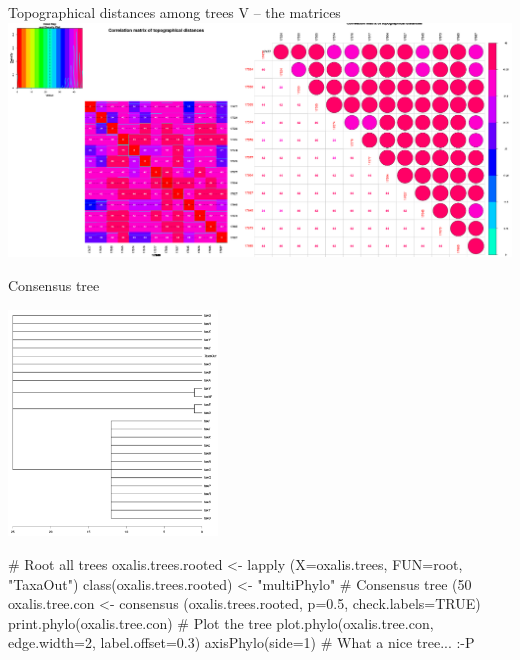 \documentclass[compress, ucs, xelatex, 11pt, xcolor=svgnames,
  hyperref={
    bookmarks=true,
    unicode=true,
    colorlinks=true,
    pdftitle={Molecular data in R},
    plainpages=false,
    pdfauthor={Vojtech Zeisek},
    pdfsubject={Course about phylogeny and evolution in R},
    pdfcreator={XeLaTeX},
    pdfkeywords={R, evolution, phylogeny, molecular data},
    linkcolor=Tomato,
    anchorcolor=SaddleBrown,
    citecolor=Goldenrod,
    filecolor=DarkMagenta,
    menucolor=Sienna,
    urlcolor=DarkTurquoise,
    pdftex},
  url={hyphens, lowtilde} %
  ]{beamer}
\begin{document}
\begin{frame}{Topographical distances among trees V -- the matrices}
\includegraphics[width=\textwidth]{oxalis-dist.png}
\end{frame}


\begin{frame}[fragile]{Consensus tree}
\begin{multicols}{2}
  \includegraphics[height=6cm]{oxalis-cons.png}
  \begin{spluscode}
    # Root all trees
    oxalis.trees.rooted <- lapply
      (X=oxalis.trees, FUN=root,
      "TaxaOut")
    class(oxalis.trees.rooted) <-
      "multiPhylo"
    # Consensus tree (50 %
    oxalis.tree.con <- consensus
      (oxalis.trees.rooted, p=0.5,
      check.labels=TRUE)
    print.phylo(oxalis.tree.con)
    # Plot the tree
    plot.phylo(oxalis.tree.con,
      edge.width=2, label.offset=0.3)
    axisPhylo(side=1)
    # What a nice tree... :-P
  \end{spluscode}
\end{multicols}
\end{frame}
\end{document}
